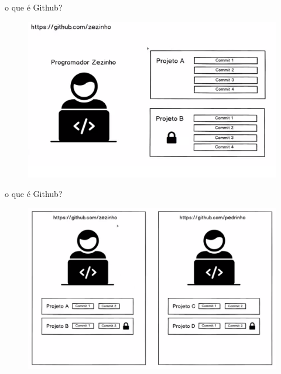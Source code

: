 \documentclass[12pt]{beamer}
\begin{document}


\begin{frame}{o que é Github?}
	\begin{figure}[!htb]
    	\centering
		\includegraphics[scale=0.5]{figuras/fig9.png} 
	\end{figure}
\end{frame}



\begin{frame}{o que é Github?}
	\begin{figure}[!htb]
    	\centering
		\includegraphics[scale=0.3]{figuras/fig10.png} 
	\end{figure}
\end{frame}
\end{document}
